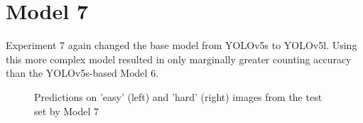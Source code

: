 \section{Model 7}
Experiment 7 again changed the base model from YOLOv5s to YOLOv5l. Using this more complex model resulted in only marginally greater counting accuracy than the YOLOv5s-based Model 6.

\begin{figure}
\caption{Predictions on 'easy' (left) and 'hard' (right) images from the test set by Model 7}
\label{model7}
\end{figure}